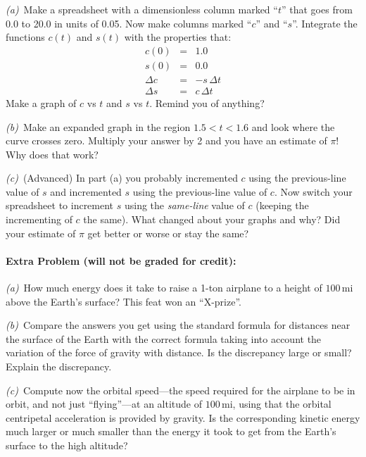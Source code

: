 \documentclass[12pt]{article}
\newcommand{\mi}{\mathrm{mi}}
\newcounter{problem}
\begin{document}
\textsl{(a)}~Make a spreadsheet with a dimensionless column marked
``$t$'' that goes from 0.0 to 20.0 in units of 0.05.  Now make columns
marked ``$c$'' and ``$s$''.  Integrate the functions $c(t)$ and
$s(t)$ with the properties that:
\begin{eqnarray}\displaystyle
c(0) & = & 1.0 \\
s(0) & = & 0.0 \\
\Delta c & = & -s\,\Delta t \\
\Delta s & = & c\,\Delta t
\end{eqnarray}
Make a graph of $c$ vs $t$ and $s$ vs $t$.  Remind you of anything?

\textsl{(b)}~Make an expanded graph in the region $1.5<t<1.6$ and
look where the curve crosses zero.  Multiply your answer by 2 and you
have an estimate of $\pi$!  Why does that work?

\textsl{(c)}~(Advanced) In part (a) you probably incremented $c$ using
the previous-line value of $s$ and incremented $s$ using the
previous-line value of $c$.  Now switch your spreadsheet to increment
$s$ using the \emph{same-line} value of $c$ (keeping the incrementing
of $c$ the same).  What changed about your graphs and why?  Did your
estimate of $\pi$ get better or worse or stay the same?

\paragraph{Extra Problem (will not be graded for credit):}%
\textsl{(a)}~How much energy does it take to raise a 1-ton airplane to
a height of $100\,\mi$ above the Earth's surface?  This feat won an
``X-prize''.

\textsl{(b)}~Compare the answers you get using the standard formula
for distances near the surface of the Earth with the correct formula
taking into account the variation of the force of gravity with
distance.  Is the discrepancy large or small?  Explain the
discrepancy.

\textsl{(c)}~Compute now the orbital speed---the speed required for
the airplane to be in orbit, and not just ``flying''---at an altitude
of $100\,\mi$, using that the orbital centripetal acceleration is
provided by gravity.  Is the corresponding kinetic energy much larger
or much smaller than the energy it took to get from the Earth's
surface to the high altitude?
\end{document}
